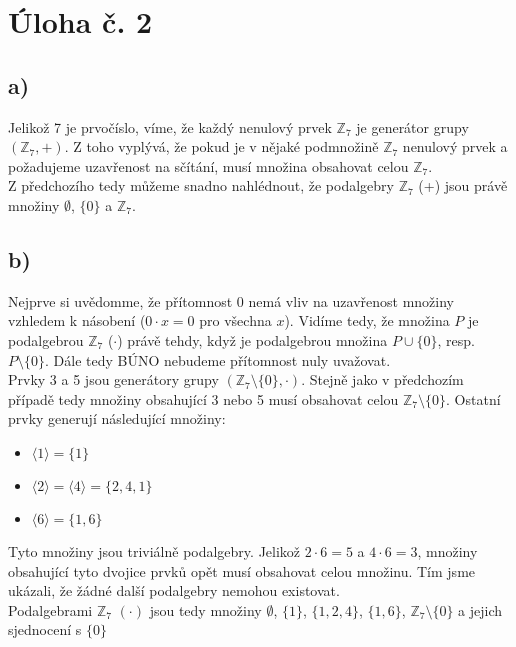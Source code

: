 \documentclass{scrartcl}
\begin{document}
    \section*{Úloha č. 2}
    \subsection*{a)}
    Jelikož 7 je prvočíslo, víme, že každý nenulový prvek $\mathbb{Z}_7$ je generátor grupy $(\mathbb{Z}_7,+)$. Z toho vyplývá, že pokud je v nějaké podmnožině $\mathbb{Z}_7$ nenulový prvek a požadujeme uzavřenost na sčítání, musí množina obsahovat celou $\mathbb{Z}_7$.\\

    Z předchozího tedy můžeme snadno nahlédnout, že podalgebry $\mathbb{Z}_7$ (+) jsou právě množiny $\emptyset$, $\{0\}$ a $\mathbb{Z}_7$.

    \subsection*{b)}
    Nejprve si uvědomme, že přítomnost 0 nemá vliv na uzavřenost množiny vzhledem k násobení ($0 \cdot x = 0$ pro všechna $x$). Vidíme tedy, že množina $P$ je podalgebrou $\mathbb{Z}_7$ ($\cdot$) právě tehdy, když je podalgebrou množina $P \cup \{0\}$, resp. $P \setminus \{0\}$. Dále tedy BÚNO nebudeme přítomnost nuly uvažovat.\\

    Prvky 3 a 5 jsou generátory grupy $(\mathbb{Z}_7 \setminus \{0\}, \cdot)$. Stejně jako v předchozím případě tedy množiny obsahující 3 nebo 5 musí obsahovat celou $\mathbb{Z}_7 \setminus \{0\}$. 
    Ostatní prvky generují následující množiny:
    \begin{itemize}
        \item $\langle 1 \rangle = \{1\}$
        \item $\langle 2 \rangle = \langle 4 \rangle = \{2,4,1\}$
        \item $\langle 6 \rangle = \{1,6\}$
    \end{itemize}
    Tyto množiny jsou triviálně podalgebry. Jelikož $2 \cdot 6 = 5$ a $4 \cdot 6 = 3$, množiny obsahující tyto dvojice prvků opět musí obsahovat celou množinu. Tím jsme ukázali, že žádné další podalgebry nemohou existovat. \\

    Podalgebrami $\mathbb{Z}_7$ $(\cdot)$ jsou tedy množiny $\emptyset$, $\{1\}$, $\{1,2,4\}$, $\{1,6\}$, $\mathbb{Z}_7 \setminus \{0\}$ a jejich sjednocení s $\{0\}$
\end{document}
